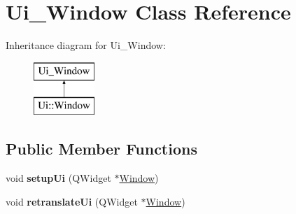 \hypertarget{class_ui___window}{}\section{Ui\+\_\+\+Window Class Reference}
\label{class_ui___window}
Inheritance diagram for Ui\+\_\+\+Window\+:\begin{figure}[H]
\begin{center}
\leavevmode
\includegraphics[height=2.000000cm]{class_ui___window}
\end{center}
\end{figure}
\subsection*{Public Member Functions}
\begin{DoxyCompactItemize}
\item 
\mbox{\label{class_ui___window_adaef25b7c1b0e3791a28344412c7c3ee}} 
void {\bfseries setup\+Ui} (Q\+Widget $\ast$\mbox{\hyperlink{class_window}{Window}})
\item 
\mbox{\label{class_ui___window_ad3eaf2336ed8418baad54d6703daaeea}} 
void {\bfseries retranslate\+Ui} (Q\+Widget $\ast$\mbox{\hyperlink{class_window}{Window}})
\end{DoxyCompactItemize}
